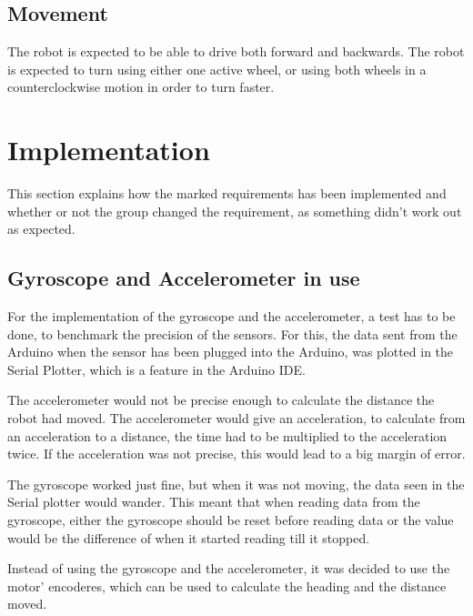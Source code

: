 \subsection{Movement}
\label{sec:i1Movement}
The robot is expected to be able to drive both forward and backwards. The robot is expected to turn using either one active wheel, or using both wheels in a counterclockwise motion in order to turn faster.


\section{Implementation}
\label{sec:i1Implementation}
This section explains how the marked requirements has been implemented and whether or not the group changed the requirement, as something didn't work out as expected. 

\subsection{Gyroscope and Accelerometer in use}
\label{sec:i1Gyroscope and Accelerometer in use}
For the implementation of the gyroscope and the accelerometer, a test has to be done, to benchmark the precision of the sensors. For this, the data sent from the Arduino when the sensor has been plugged into the Arduino, was plotted in the Serial Plotter, which is a feature in the Arduino IDE. 

The accelerometer would not be precise enough to calculate the distance the robot had moved. The accelerometer would give an acceleration, to calculate from an acceleration to a distance, the time had to be multiplied to the acceleration twice. If the acceleration was not precise, this would lead to a big margin of error. 

The gyroscope worked just fine, but when it was not moving, the data seen in the Serial plotter would wander. This meant that when reading data from the gyroscope, either the gyroscope should be reset before reading data or the value would be the difference of when it started reading till it stopped. 

Instead of using the gyroscope and the accelerometer, it was decided to use the motor' encoderes, which can be used to calculate the heading and the distance moved. 


